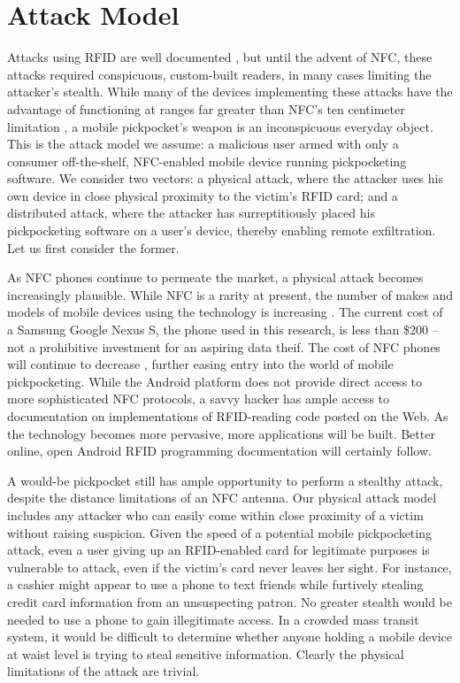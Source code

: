 \documentclass{sig-alternate}
\begin{document}
\section{Attack Model}
Attacks using RFID are well documented \cite{picking-virtual-pockets} \cite{eavesdropping-attacks-hfrfid-tokens}, but until the advent of NFC, these attacks required conspicuous, custom-built readers, in many cases limiting the attacker's stealth.  While many of the devices implementing these attacks have the advantage of functioning at ranges far greater than NFC's ten centimeter limitation \cite{Kirschenbaum06howto}, a mobile pickpocket's weapon is an inconspicuous everyday object.  This is the attack model we assume:  a malicious user armed with only a consumer off-the-shelf, NFC-enabled mobile device running pickpocketing software.  We consider two vectors:  a physical attack, where the attacker uses his own device in close physical proximity to the victim's RFID card; and a distributed attack, where the attacker has surreptitiously placed his pickpocketing software on a user's device, thereby enabling remote exfiltration.  Let us first consider the former.  

As NFC phones continue to permeate the market, a physical attack becomes increasingly plausible.  While NFC is a rarity at present, the number of makes and models of mobile devices using the technology is increasing \cite{list-of-nfc-phones}.  The current cost of a Samsung Google Nexus S, the phone used in this research, is less than \$200 -- not a prohibitive investment for an aspiring data theif.  The cost of NFC phones will continue to decrease \cite{ds-nfc-enabling-technology}, further easing entry into the world of mobile pickpocketing.  While the Android platform does not provide direct access to more sophisticated NFC protocols, a savvy hacker has ample access to documentation on implementations of RFID-reading code posted on the Web.  As the technology becomes more pervasive, more applications will be built.  Better online, open Android RFID programming documentation will certainly follow.

A would-be pickpocket still has ample opportunity to perform a stealthy attack, despite the distance limitations of an NFC antenna.  Our physical attack model includes any attacker who can easily come within close proximity of a victim without raising suspicion.  Given the speed of a potential mobile pickpocketing attack, even a user giving up an RFID-enabled card for legitimate purposes is vulnerable to attack, even if the victim's card never leaves her sight.  For instance, a cashier might appear to use a phone to text friends while furtively stealing credit card information from an unsuspecting patron.  No greater stealth would be needed to use a phone to gain illegitimate access.  In a crowded mass transit system, it would be difficult to determine whether anyone holding a mobile device at waist level is trying to steal sensitive information.  Clearly the physical limitations of the attack are trivial.
\end{document}
